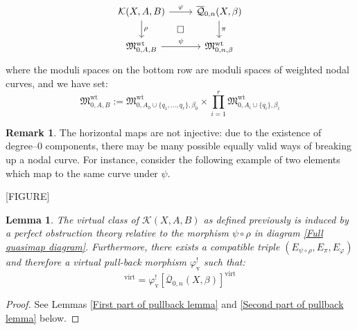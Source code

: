 \documentclass[11pt]{amsart}
\newcommand{\Q}[4]{\overline{\mathcal Q}_{#1,#2}(#3,#4)}
\newcommand{\MM}{\mathfrak M}
\newcommand{\virt}[1]{[#1]^{\operatorname{virt}}}
\theoremstyle{plain}
\newtheorem{lemma}[thm]{Lemma}
\theoremstyle{definition}
\newtheorem{remark}[thm]{Remark}
\begin{document}
\begin{equation} \label{Full quasimap diagram}
\begin{tikzcd}
\mathcal{K}(X,A,B) \ar[r,"\varphi"] \ar[d,"\rho"] \ar[rd,phantom,"\square"] & \Q{0}{n}{X}{\beta} \ar[d,"\pi"] \\
\MM_{0,A,B}^{\operatorname{wt}} \ar[r,"\psi"] & \MM_{0,n,\beta}^{\operatorname{wt}}
\end{tikzcd}
\end{equation}
where the moduli spaces on the bottom row are moduli spaces of weighted nodal curves, and we have set:
\begin{equation*} \MM_{0,A,B}^{\operatorname{wt}} := \MM_{0,A_0\cup\{q_1,\ldots,q_r\},\beta_0}^{\operatorname{wt}} \times \prod_{i=1}^r \MM_{0,A_i\cup\{q_i\},\beta_i}^{\operatorname{wt}} \end{equation*}

\begin{remark} The horizontal maps are not injective: due to the existence of degree--$0$ components, there may be many possible equally valid ways of breaking up a nodal curve. For instance, consider the following example of two elements which map to the same curve under $\psi$.

[FIGURE]
\end{remark}

\begin{lemma} \label{Lemma product class equals pullback class} The virtual class of $\mathcal{K}(X,A,B)$ as defined previously is induced by a perfect obstruction theory relative to the morphism $\psi \circ \rho$ in diagram \eqref{Full quasimap diagram}. Furthermore, there exists a compatible triple $(E_{\psi \circ \rho}, E_{\pi}, E_{\varphi})$ and therefore a virtual pull-back morphism $\varphi_{\text{v}}^!$ such that:
\begin{equation*} \virt{\mathcal{K}(X,A,B)} = \varphi_{\text{v}}^! \virt{\Q{0}{n}{X}{\beta}} \end{equation*} \end{lemma}
\begin{proof} See Lemmas \ref{First part of pullback lemma} and \ref{Second part of pullback lemma} below. \end{proof}
\end{document}
